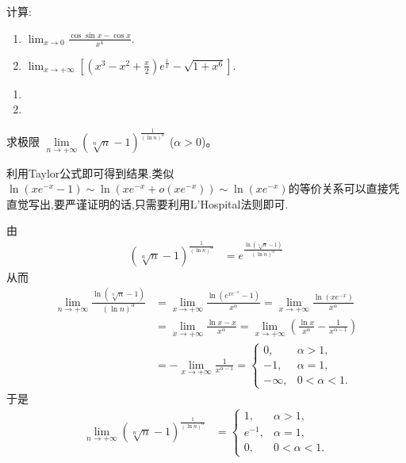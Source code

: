 \documentclass[../../main.tex]{subfiles}%
\begin{document}
\begin{example}
计算:
\begin{enumerate}
\item \(
\lim_{x \to 0} \frac{\cos \sin x - \cos x}{x^4}.
\)

\item \(
\lim_{x \to +\infty} \left[\left(x^3 - x^2 + \frac{x}{2}\right) e^{\frac{1}{x}} - \sqrt{1 + x^6}\right].
\)
\end{enumerate}
\end{example}
\begin{solution}
\begin{enumerate}
\item 

\item 
\end{enumerate}

\end{solution}

\begin{example}
求极限 $\lim\limits_{n \to +\infty} (\sqrt[n]{n} - 1)^{\frac{1}{(\ln n)^{\alpha}}}$ ($\alpha > 0$)。
\end{example}
\begin{note}
利用Taylor公式即可得到结果.类似$\ln \left( xe^{-x}-1 \right) \sim \ln \left( xe^{-x}+o\left( xe^{-x} \right) \right) \sim \ln \left( xe^{-x} \right)$的等价关系可以直接凭直觉写出,要严谨证明的话,只需要利用L'Hospital法则即可.
\end{note}
\begin{solution}
由
\begin{align*}
(\sqrt[n]{n} - 1)^{\frac{1}{(\ln n)^{\alpha}}} &= e^{\frac{\ln(\sqrt[n]{n} - 1)}{(\ln n)^{\alpha}}}
\end{align*}
从而
\begin{align*}
\lim_{n \to +\infty} \frac{\ln(\sqrt[n]{n} - 1)}{(\ln n)^{\alpha}} &= \lim_{x \to +\infty} \frac{\ln(e^{x e^{-x}} - 1)}{x^{\alpha}} = \lim_{x \to +\infty} \frac{\ln(x e^{-x})}{x^{\alpha}} \\
&= \lim_{x \to +\infty} \frac{\ln x - x}{x^{\alpha}} = \lim_{x \to +\infty} \left(\frac{\ln x}{x^{\alpha}} - \frac{1}{x^{\alpha - 1}}\right) \\
&= - \lim_{x \to +\infty} \frac{1}{x^{\alpha - 1}} = \begin{cases}
0, & \alpha > 1, \\
-1, & \alpha = 1, \\
-\infty, & 0 < \alpha < 1.
\end{cases}
\end{align*}
于是
\begin{align*}
\lim_{n \to +\infty} (\sqrt[n]{n} - 1)^{\frac{1}{(\ln n)^{\alpha}}} &= \begin{cases}
1, & \alpha > 1, \\
e^{-1}, & \alpha = 1, \\
0, & 0 < \alpha < 1.
\end{cases}
\end{align*} 

\end{solution}
\end{document}
